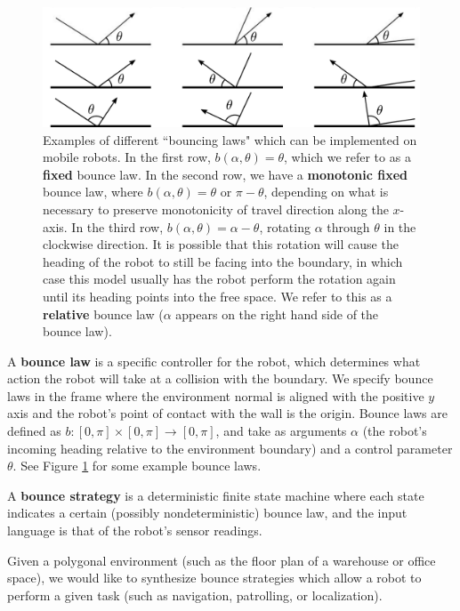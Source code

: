 \documentclass[]{svproc}  %
\begin{document}
\begin{figure}
    \includegraphics[width=0.8\linewidth]{figures/bounce_examples.pdf}
    \centering
    \caption[test]{\label{fig:bex}Examples of different ``bouncing laws" which can be implemented on
mobile robots. In the first row, $b(\alpha, \theta) = \theta$, which we refer to
as a \textbf{fixed} bounce law. In the second row, we have a \textbf{monotonic
fixed} bounce law, where
$b(\alpha, \theta) = \theta$ or $\pi-\theta$, depending on what is necessary to
preserve monotonicity of travel direction along the $x$-axis. In the third
row, $b(\alpha, \theta) = \alpha - \theta$, rotating $\alpha$ through $\theta$ in the clockwise
direction. It is possible that this rotation will cause the 
heading of the robot to still be facing into the boundary, in which case this model usually has the robot 
perform the rotation again until its heading points into the free space. We
refer to this as a \textbf{relative} bounce law ($\alpha$ appears on the
right hand side of the bounce law).
}
\end{figure}

\begin{definition}
A \textbf{bounce law} is a specific controller for the robot, which determines
what action the robot will take at a collision with the boundary.
We specify 
bounce laws in the
frame where the environment normal is aligned with the positive $y$ axis and the
robot's point of contact with the wall is the origin.  
Bounce laws are defined as $b: [0,\pi] \times [0,\pi] \to [0,\pi]$, and take as
arguments $\alpha$ (the robot's incoming heading relative to the environment
boundary) and a control parameter $\theta$. See Figure \ref{fig:bex} for some
example bounce laws. 
\end{definition}

\begin{definition}
A \textbf{bounce strategy} is a deterministic finite state machine where each
state indicates a certain (possibly nondeterministic) bounce law, and the input language is that of the
robot's sensor readings.
\end{definition}

Given a polygonal environment (such as the floor plan of a warehouse or office
space), we would like to synthesize bounce strategies which allow a robot to
perform a given task (such as navigation, patrolling, or localization).
\end{document}
